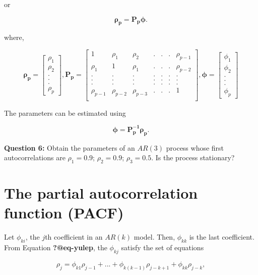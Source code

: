 \documentclass[
  11pt,
  a4paper,
]{report}
\begin{document}
or

\[\bm{\rho_p}=\bm{P_p\phi}.\]

where,

\[\bm{\rho_p} = \left[\begin{array}
{r}
\rho_1  \\
\rho_2  \\
.\\
.\\
.\\
\rho_p
\end{array}\right], \bm{P_p} = \left[\begin{array}
{rrrrrrr}
1 & \rho_1 & \rho_2 & .&.&.& \rho_{p-1} \\
\rho_1 & 1 & \rho_1 & .&.&.& \rho_{p-2} \\
. & . & . & .&.&.& . \\
. & . & . & .&.&.& . \\
. & . & . & .&.&.& . \\
\rho_{p-1} & \rho_{p-2} & \rho_{p-3} & .&.&.& 1 \\
\end{array}\right], \bm{\phi} = \left[\begin{array}
{r}
\phi_1  \\
\phi_2  \\
.\\
.\\
.\\
\phi_p
\end{array}\right]\]

The parameters can be estimated using

\[\bm{\phi}=\bm{P_p^{-1}\rho_p}.\]

\textbf{Question 6:} Obtain the parameters of an \(AR(3)\) process whose
first autocorrelations are \(\rho_1=0.9\); \(\rho_2=0.9\);
\(\rho_3=0.5\). Is the process stationary?

\section{The partial autocorrelation function
(PACF)}\label{the-partial-autocorrelation-function-pacf}

Let \(\phi_{ki}\), the \(j\)th coefficient in an \(AR(k)\) model. Then,
\(\phi_{kk}\) is the last coefficient. From Equation
\textbf{?@eq-yulep}, the \(\phi_{kj}\) satisfy the set of equations

\begin{equation}
\rho_j=\phi_{k1}\rho_{j-1}+...+\phi_{k(k-1)}\rho_{j-k+1}+\phi_{kk}\rho_{j-k},
\end{equation}
\end{document}
